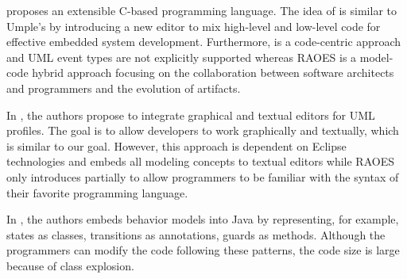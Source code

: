  \cite{voelter2012mbeddr} proposes an extensible C-based programming language.
The idea of  is similar to Umple's by introducing a new editor to mix high-level and low-level code for effective embedded system development. 
Furthermore,  is a code-centric approach and UML event types are not explicitly supported whereas RAOES is a model-code hybrid approach focusing on the collaboration between software architects and programmers and the evolution of artifacts.  


In \cite{Maro:2015:IGT:2814251.2814253}, the authors propose to integrate graphical and textual editors for UML profiles.
The goal is to allow developers to work graphically and textually, which is similar to our goal.
However, this approach is dependent on Eclipse technologies and embeds all modeling concepts to textual editors while RAOES only introduces partially to allow programmers to be familiar with the syntax of their favorite programming language.

In \cite{balz2009embedding}, the authors embeds behavior models into Java by representing, for example, states as classes, transitions as annotations, guards as methods.
Although the programmers can modify the code following these patterns, the code size is large because of class explosion.

